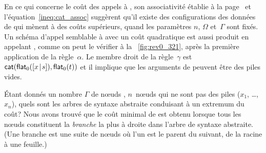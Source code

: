 En ce qui concerne le coût des appels à , son associativité
 établie à la page~\pageref{proof_assoc_cat} et
l'équation~\eqref{ineq:cat_assoc}  suggèrent
qu'il existe des configurations des données de
 qui mènent à des
coûts supérieurs, quand les paramètres \(n\), \(\Omega\) et~\(\Gamma\)
sont fixés. Un schéma d'appel semblable à
 avec un coût quadratique est aussi
produit en appelant ,
comme on peut le vérifier à la \fig~\vref{fig:rev0_321}, après la
première application de la règle~\(\alpha\). Le membre droit de la
règle~\(\gamma\) est
\(\textsf{cat}(\textsf{flat}_0([{x}\!\mid\!{s}]),\textsf{flat}_0(t))\)
 et il implique que les arguments de
 peuvent être des piles vides.

Étant donnés un nombre \(\Gamma\) de nœuds , \(n\)~nœuds qui
ne sont pas des piles (\(x_1\), \dots, \(x_n\)), quels sont les arbres
de syntaxe abstraite conduisant à un extremum du coût? Nous avons
trouvé que le coût minimal de  est
obtenu lorsque tous les nœuds  constituent la
\emph{branche} la plus à droite dans l'arbre de
syntaxe abstraite. (Une branche est une suite de nœuds où l'un est le
parent du suivant, de la racine à une feuille.)

